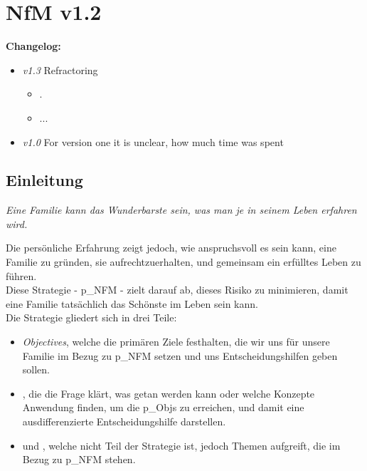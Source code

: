 \chapter{NfM v1.2}
\setcounter{section}{0}

\textbf{Changelog:}\\

\begin{itemize}
	\item \textit{v1.3} Refractoring
	\begin{itemize}
		\item {}.
		\item ...
	\end{itemize}
	\item \textit{v1.0} For version one it is unclear, how much time was spent
\end{itemize}

\section{Einleitung}
\begin{center}
	\textit{Eine Familie kann das Wunderbarste sein, was man je in seinem Leben erfahren wird.}
\end{center}

Die persönliche Erfahrung zeigt jedoch, wie anspruchsvoll es sein kann, eine Familie zu gründen, sie aufrechtzuerhalten, und gemeinsam ein erfülltes Leben zu führen.\\


Diese Strategie - \gls{p_NFM} - zielt darauf ab, dieses Risiko zu minimieren, damit eine Familie tatsächlich das Schönste im Leben sein kann.\\


Die Strategie gliedert sich in drei Teile:
\begin{itemize}
	\item \textit{Objectives}, welche die primären Ziele festhalten, die wir uns für unsere Familie im Bezug zu \gls{p_NFM} setzen und uns Entscheidungshilfen geben sollen.
	\item \textit{}, die die Frage klärt, was getan werden kann oder welche Konzepte Anwendung finden, um die \glspl{p_Obj} zu erreichen, und damit eine ausdifferenzierte Entscheidungshilfe darstellen.
	\item und \textit{}, welche nicht Teil der Strategie ist, jedoch Themen aufgreift, die im Bezug zu \gls{p_NFM} stehen.
\end{itemize}

